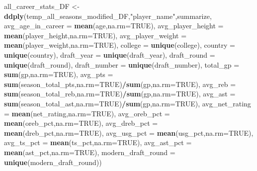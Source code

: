 \documentclass[
]{article}
\newenvironment{Shaded}{\begin{snugshade}}{\end{snugshade}}
\newcommand{\AttributeTok}[1]{\textcolor[rgb]{0.13,0.29,0.53}{#1}}
\newcommand{\ConstantTok}[1]{\textcolor[rgb]{0.56,0.35,0.01}{#1}}
\newcommand{\FunctionTok}[1]{\textcolor[rgb]{0.13,0.29,0.53}{\textbf{#1}}}
\newcommand{\NormalTok}[1]{#1}
\newcommand{\OtherTok}[1]{\textcolor[rgb]{0.56,0.35,0.01}{#1}}
\newcommand{\SpecialCharTok}[1]{\textcolor[rgb]{0.81,0.36,0.00}{\textbf{#1}}}
\newcommand{\StringTok}[1]{\textcolor[rgb]{0.31,0.60,0.02}{#1}}
\begin{document}
\begin{Shaded}
\begin{Highlighting}[]
\NormalTok{all\_career\_stats\_DF }\OtherTok{\textless{}{-}} \FunctionTok{ddply}\NormalTok{(temp\_all\_seasons\_modified\_DF,}\StringTok{"player\_name"}\NormalTok{,summarize,}
  \AttributeTok{avg\_age\_in\_career =} \FunctionTok{mean}\NormalTok{(age,}\AttributeTok{na.rm=}\ConstantTok{TRUE}\NormalTok{),}
  \AttributeTok{avg\_player\_height =} \FunctionTok{mean}\NormalTok{(player\_height,}\AttributeTok{na.rm=}\ConstantTok{TRUE}\NormalTok{),}
  \AttributeTok{avg\_player\_weight =} \FunctionTok{mean}\NormalTok{(player\_weight,}\AttributeTok{na.rm=}\ConstantTok{TRUE}\NormalTok{),}
  \AttributeTok{college   =} \FunctionTok{unique}\NormalTok{(college),}
  \AttributeTok{country =} \FunctionTok{unique}\NormalTok{(country),}
  \AttributeTok{draft\_year =} \FunctionTok{unique}\NormalTok{(draft\_year),}
  \AttributeTok{draft\_round =} \FunctionTok{unique}\NormalTok{(draft\_round),}
  \AttributeTok{draft\_number =} \FunctionTok{unique}\NormalTok{(draft\_number),}
  \AttributeTok{total\_gp =} \FunctionTok{sum}\NormalTok{(gp,}\AttributeTok{na.rm=}\ConstantTok{TRUE}\NormalTok{),}
  \AttributeTok{avg\_pts   =} \FunctionTok{sum}\NormalTok{(season\_total\_pts,}\AttributeTok{na.rm=}\ConstantTok{TRUE}\NormalTok{)}\SpecialCharTok{/}\FunctionTok{sum}\NormalTok{(gp,}\AttributeTok{na.rm=}\ConstantTok{TRUE}\NormalTok{),}
  \AttributeTok{avg\_reb   =} \FunctionTok{sum}\NormalTok{(season\_total\_reb,}\AttributeTok{na.rm=}\ConstantTok{TRUE}\NormalTok{)}\SpecialCharTok{/}\FunctionTok{sum}\NormalTok{(gp,}\AttributeTok{na.rm=}\ConstantTok{TRUE}\NormalTok{),}
  \AttributeTok{avg\_ast   =} \FunctionTok{sum}\NormalTok{(season\_total\_ast,}\AttributeTok{na.rm=}\ConstantTok{TRUE}\NormalTok{)}\SpecialCharTok{/}\FunctionTok{sum}\NormalTok{(gp,}\AttributeTok{na.rm=}\ConstantTok{TRUE}\NormalTok{),}
  \AttributeTok{avg\_net\_rating =} \FunctionTok{mean}\NormalTok{(net\_rating,}\AttributeTok{na.rm=}\ConstantTok{TRUE}\NormalTok{),}
  \AttributeTok{avg\_oreb\_pct =} \FunctionTok{mean}\NormalTok{(oreb\_pct,}\AttributeTok{na.rm=}\ConstantTok{TRUE}\NormalTok{),}
  \AttributeTok{avg\_dreb\_pct =} \FunctionTok{mean}\NormalTok{(dreb\_pct,}\AttributeTok{na.rm=}\ConstantTok{TRUE}\NormalTok{),}
  \AttributeTok{avg\_usg\_pct =} \FunctionTok{mean}\NormalTok{(usg\_pct,}\AttributeTok{na.rm=}\ConstantTok{TRUE}\NormalTok{),}
  \AttributeTok{avg\_ts\_pct =} \FunctionTok{mean}\NormalTok{(ts\_pct,}\AttributeTok{na.rm=}\ConstantTok{TRUE}\NormalTok{),}
  \AttributeTok{avg\_ast\_pct =} \FunctionTok{mean}\NormalTok{(ast\_pct,}\AttributeTok{na.rm=}\ConstantTok{TRUE}\NormalTok{),}
  \AttributeTok{modern\_draft\_round =} \FunctionTok{unique}\NormalTok{(modern\_draft\_round))}
\end{Highlighting}
\end{Shaded}
\end{document}
